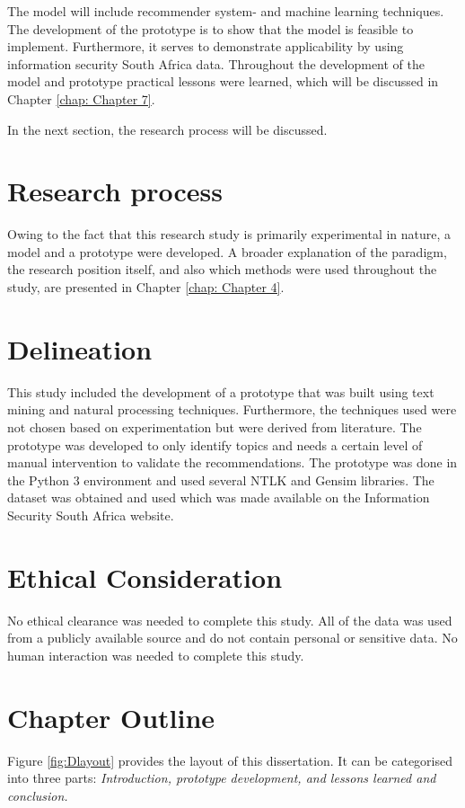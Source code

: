 The model will include recommender system- and machine learning techniques. The development of the prototype is to show that the model is feasible to implement. Furthermore, it serves to demonstrate applicability by using information security South Africa data. Throughout the development of the model and prototype practical lessons were learned, which will be discussed in Chapter \ref{chap: Chapter 7}.

In the next section, the research process will be discussed.

\section{Research process}

Owing to the fact that this research study is primarily experimental in nature, a model and a prototype were developed. A broader explanation of the paradigm, the research position itself, and also which methods were used throughout the study, are presented in Chapter \ref{chap: Chapter 4}.

\section{Delineation}

This study included the development of a prototype that was built using text mining and natural processing techniques. Furthermore, the techniques used were not chosen based on experimentation but were derived from literature. 
The prototype was developed to only identify topics and needs a certain level of manual intervention to validate the recommendations.
The prototype was done in the Python 3 environment and used several NTLK and Gensim libraries. The dataset was obtained and used which was made available on the Information Security South Africa website. 


\section{Ethical Consideration}

No ethical clearance was needed to complete this study. All of the data was used from a publicly available source and do not contain personal or sensitive data. No human interaction was needed to complete this study.

\section{Chapter Outline}
Figure \ref{fig:Dlayout} provides the layout of this dissertation. It can be categorised into three parts: 
\textit{Introduction, prototype development, and lessons learned and conclusion.}

